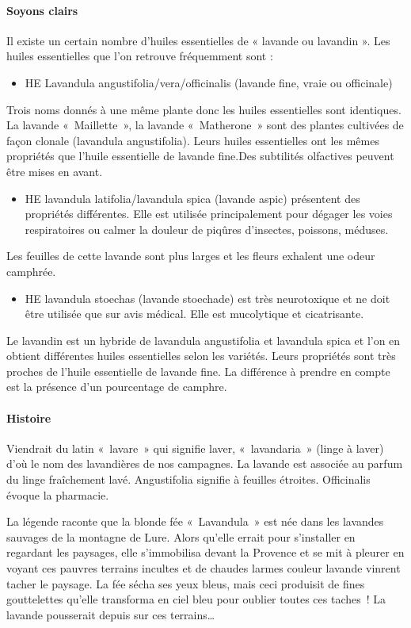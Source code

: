 \documentclass[12pt,a4wide]{article}
\begin{document}
\paragraph{Soyons clairs}
\label{sec-4-7-2-3}
Il existe un certain nombre d'huiles essentielles de « lavande ou lavandin ». Les huiles essentielles que l'on retrouve fréquemment sont :
\begin{itemize}
\item HE Lavandula angustifolia/vera/officinalis (lavande fine, vraie ou officinale)
\end{itemize}
Trois noms donnés à une même plante donc les huiles essentielles sont identiques. La lavande « Maillette », la lavande « Matherone » sont des plantes cultivées de façon clonale (lavandula angustifolia). Leurs huiles essentielles ont les mêmes propriétés que l'huile essentielle de lavande fine.Des subtilités olfactives peuvent être mises en avant.
\begin{itemize}
\item HE lavandula latifolia/lavandula spica (lavande aspic) présentent des propriétés différentes. Elle est utilisée principalement pour dégager les voies respiratoires ou calmer la douleur de piqûres d'insectes, poissons, méduses.
\end{itemize}
Les feuilles de cette lavande sont plus larges et les fleurs exhalent une odeur camphrée.
\begin{itemize}
\item HE lavandula stoechas (lavande stoechade) est très neurotoxique et ne doit être utilisée que sur avis médical. Elle est mucolytique et cicatrisante.
\end{itemize}
Le lavandin est un hybride de lavandula angustifolia et lavandula spica et l'on en obtient différentes huiles essentielles selon les variétés. Leurs propriétés sont très proches de l'huile essentielle de lavande fine. La différence à prendre en compte est la présence d'un pourcentage de camphre.



\paragraph{Histoire}
\label{sec-4-7-2-4}
Viendrait du latin « lavare » qui signifie laver, « lavandaria » (linge à laver) d'où le nom des lavandières de nos campagnes. La lavande est associée au parfum du linge fraîchement lavé. Angustifolia signifie à feuilles étroites. Officinalis évoque la pharmacie.

La légende raconte que la blonde fée « Lavandula » est née dans les lavandes sauvages de la montagne de Lure. Alors qu'elle errait pour s'installer en regardant les paysages, elle s'immobilisa devant la Provence et se mit à pleurer en voyant ces pauvres terrains incultes et de chaudes larmes couleur lavande vinrent tacher le paysage. La fée sécha ses yeux bleus, mais ceci produisit de fines gouttelettes qu'elle transforma en ciel bleu pour oublier toutes ces taches ! La lavande pousserait depuis sur ces terrains…
\end{document}
